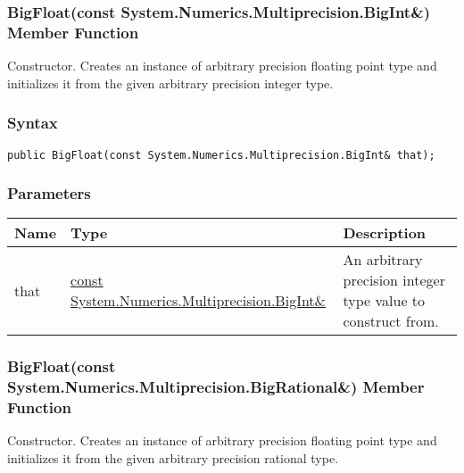 \documentclass[a4paper,oneside,11.000000pt]{book}
\begin{document}
\hypertarget{System.Numerics.Multiprecision.BigFloat.constructor.P.System.Numerics.Multiprecision.BigFloat.C.R.System.Numerics.Multiprecision.BigInt}{\subsubsection*{BigFloat(const System.Numerics.Multiprecision.BigInt\&) Member Function}}
\begin{flushleft}
Constructor. Creates an instance of arbitrary precision floating point type and initializes it from the given arbitrary precision integer type.

\end{flushleft}
\subsubsection*{Syntax}
\texttt{public BigFloat(const System.Numerics.Multiprecision.BigInt\& that);}
\subsubsection*{Parameters}
\begin{flushleft}
\begin{supertabular}[l]{!{\raggedright}p{1.30721cm}!{\raggedright}p{8.55945cm}!{\raggedright}p{4.93333cm}}
\textbf{Name}
& \textbf{Type}
& \textbf{Description}
\\
\hline
that
& \hyperlink{System.Numerics.Multiprecision.BigInt}{const System.\-Numerics.\-Multiprecision.\-BigInt\&\-}
& An arbitrary precision integer type value to construct from.

\\
\end{supertabular}

\end{flushleft}
\clearpage

\hypertarget{System.Numerics.Multiprecision.BigFloat.constructor.P.System.Numerics.Multiprecision.BigFloat.C.R.System.Numerics.Multiprecision.BigRational}{\subsubsection*{BigFloat(const System.Numerics.Multiprecision.BigRational\&) Member Function}}
\begin{flushleft}
Constructor. Creates an instance of arbitrary precision floating point type and initializes it from the given arbitrary precision rational type.

\end{flushleft}
\end{document}
